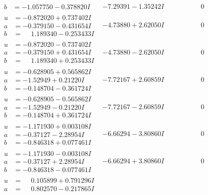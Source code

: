 \documentclass[1p]{elsarticle_modified}
\theoremstyle{definition}
\begin{document}
$$\begin{array}{c|c|c}
\begin{aligned}
b &= -1.057750 - 0.378820 I\end{aligned}
 & -7.29391 - 1.35242 I & \phantom{-0.000000 } 0 \\ \hline\begin{aligned}
u &= -0.872020 + 0.737402 I \\
a &= -0.379150 - 0.431654 I \\
b &= \phantom{-}1.189340 - 0.253433 I\end{aligned}
 & -4.73880 + 2.62050 I & \phantom{-0.000000 } 0 \\ \hline\begin{aligned}
u &= -0.872020 - 0.737402 I \\
a &= -0.379150 + 0.431654 I \\
b &= \phantom{-}1.189340 + 0.253433 I\end{aligned}
 & -4.73880 - 2.62050 I & \phantom{-0.000000 } 0 \\ \hline\begin{aligned}
u &= -0.628905 + 0.565862 I \\
a &= -1.52949 + 0.21220 I \\
b &= -0.148704 - 0.361724 I\end{aligned}
 & -7.72167 + 2.60859 I & \phantom{-0.000000 } 0 \\ \hline\begin{aligned}
u &= -0.628905 - 0.565862 I \\
a &= -1.52949 - 0.21220 I \\
b &= -0.148704 + 0.361724 I\end{aligned}
 & -7.72167 - 2.60859 I & \phantom{-0.000000 } 0 \\ \hline\begin{aligned}
u &= -1.171930 + 0.003108 I \\
a &= -0.37127 - 2.28954 I \\
b &= -0.846318 + 0.077461 I\end{aligned}
 & -6.66294 - 3.80860 I & \phantom{-0.000000 } 0 \\ \hline\begin{aligned}
u &= -1.171930 - 0.003108 I \\
a &= -0.37127 + 2.28954 I \\
b &= -0.846318 - 0.077461 I\end{aligned}
 & -6.66294 + 3.80860 I & \phantom{-0.000000 } 0 \\ \hline\begin{aligned}
u &= \phantom{-}0.105899 + 0.791296 I \\
a &= \phantom{-}0.802570 - 0.217865 I \\

\end{aligned}
\end{array}$$
\end{document}
